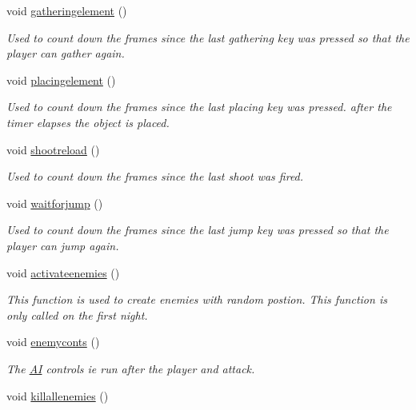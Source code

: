 \begin{DoxyCompactItemize}
void \hyperlink{classoctet_1_1minecraft__wars_aab0d43a5ef97e3cd0693dd7afc2d026d}{gatheringelement} ()
\begin{DoxyCompactList}\small\item\em Used to count down the frames since the last gathering key was pressed so that the player can gather again. \end{DoxyCompactList}\item 
void \hyperlink{classoctet_1_1minecraft__wars_aa92f3102de51e3a9da328f5bb0b1fca9}{placingelement} ()
\begin{DoxyCompactList}\small\item\em Used to count down the frames since the last placing key was pressed. after the timer elapses the object is placed. \end{DoxyCompactList}\item 
void \hyperlink{classoctet_1_1minecraft__wars_a012f43869f4e1812d2b3467e16aeb694}{shootreload} ()
\begin{DoxyCompactList}\small\item\em Used to count down the frames since the last shoot was fired. \end{DoxyCompactList}\item 
void \hyperlink{classoctet_1_1minecraft__wars_a1143a19dccab97d4227c2025a2c34b22}{waitforjump} ()
\begin{DoxyCompactList}\small\item\em Used to count down the frames since the last jump key was pressed so that the player can jump again. \end{DoxyCompactList}\item 
void \hyperlink{classoctet_1_1minecraft__wars_a72b700a60ce62322465331f8b1ae4f76}{activateenemies} ()
\begin{DoxyCompactList}\small\item\em This function is used to create enemies with random postion. This function is only called on the first night. \end{DoxyCompactList}\item 
void \hyperlink{classoctet_1_1minecraft__wars_a3afad7348f73707dc4bb39002d791856}{enemyconts} ()
\begin{DoxyCompactList}\small\item\em The \hyperlink{structoctet_1_1_a_i}{A\+I} controls ie run after the player and attack. \end{DoxyCompactList}\item 
void \hyperlink{classoctet_1_1minecraft__wars_a775fc0daacbea14fe01b1e72185e67c9}{killallenemies} ()

\end{DoxyCompactItemize}

